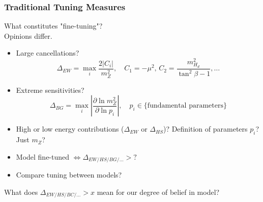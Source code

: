 \documentclass[10pt,aspectratio=169]{beamer}
\begin{document}
\begin{frame}
  \frametitle{Traditional Tuning Measures}
  \begin{center}
    What constitutes "fine-tuning"? \\
    Opinions differ.
  \end{center}
  \begin{itemize} \itemsep0.8em
    \item Large cancellations?
      \begin{equation*}
        \Delta_{EW} = \max_i \frac{2|C_i|}{m_Z^2}, \quad C_1 = -\mu^2, \,
        C_2 = \frac{m_{H_d}^2}{\tan^2\beta - 1}, \ldots
      \end{equation*}
    \item Extreme sensitivities?
      \begin{equation*}
        \Delta_{BG} = \max_i \left | \frac{\partial \ln m_Z^2}
        {\partial \ln p_i} \right | , \quad p_i \in \{\text{fundamental
        parameters}\}
      \end{equation*}
    \item High or low energy contributions ($\Delta_{EW}$ or $\Delta_{HS}$)?
      Definition of parameters $p_i$? Just $m_Z$?
    \item Model fine-tuned $\Leftrightarrow \Delta_{EW/HS/BG/\ldots} > ?$
    \item Compare tuning between models?
  \end{itemize}
  \begin{center}
  \alert{What does $\Delta_{EW/HS/BC/\ldots} > x$ mean for our degree of belief
    in model?}
  \end{center}
\end{frame}
\end{document}
